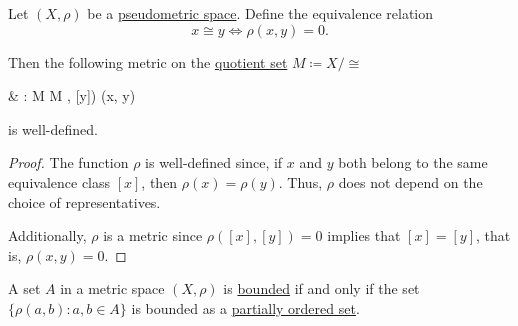 \begin{proposition}\label{thm:pseudometric_to_metric}
  Let \( (X, \rho) \) be a \hyperref[def:metric_space]{pseudometric space}. Define the equivalence relation
  \begin{equation*}
    x \cong y \iff \rho(x, y) = 0.
  \end{equation*}

  Then the following metric on the \hyperref[thm:equivalence_partition]{quotient set} \( M \coloneqq X / \cong \)
  \begin{balign*}
     & \rho: M \times M \to [0, \infty)    \\
     & \rho([x], [y]) \coloneqq \rho(x, y)
  \end{balign*}
  is well-defined.
\end{proposition}
\begin{proof}
  The function \( \rho \) is well-defined since, if \( x \) and \( y \) both belong to the same equivalence class \( [x] \), then \( \rho(x) = \rho(y) \). Thus, \( \rho \) does not depend on the choice of representatives.

  Additionally, \( \rho \) is a metric since \( \rho([x], [y]) = 0 \) implies that \( [x] = [y] \), that is, \( \rho(x, y) = 0 \).
\end{proof}

\begin{proposition}\label{rem:bounded_set_metric_order_equivalence}
  A set \( A \) in a metric space \( (X, \rho) \) is \hyperref[def:metric_space/bounded_set]{bounded} if and only if the set \( \{ \rho(a, b) \colon a, b \in A \} \) is bounded as a \hyperref[def:extremal_points/bounds]{partially ordered set}.
\end{proposition}

